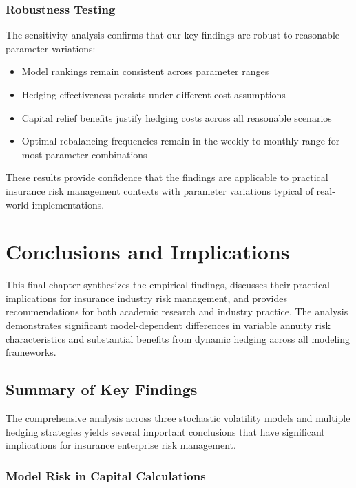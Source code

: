 \documentclass[12pt,a4paper]{report}
\begin{document}
\subsection{Robustness Testing}

The sensitivity analysis confirms that our key findings are robust to reasonable parameter variations:

\begin{itemize}
\item Model rankings remain consistent across parameter ranges
\item Hedging effectiveness persists under different cost assumptions  
\item Capital relief benefits justify hedging costs across all reasonable scenarios
\item Optimal rebalancing frequencies remain in the weekly-to-monthly range for most parameter combinations
\end{itemize}

These results provide confidence that the findings are applicable to practical insurance risk management contexts with parameter variations typical of real-world implementations.

\chapter{Conclusions and Implications}

This final chapter synthesizes the empirical findings, discusses their practical implications for insurance industry risk management, and provides recommendations for both academic research and industry practice. The analysis demonstrates significant model-dependent differences in variable annuity risk characteristics and substantial benefits from dynamic hedging across all modeling frameworks.

\section{Summary of Key Findings}

The comprehensive analysis across three stochastic volatility models and multiple hedging strategies yields several important conclusions that have significant implications for insurance enterprise risk management.

\subsection{Model Risk in Capital Calculations}
\end{document}
